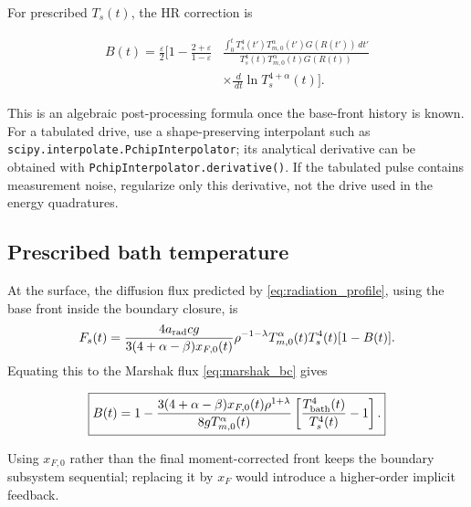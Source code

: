 \documentclass[11pt]{article}
\numberwithin{equation}{section}
\newcommand{\Ts}{T_s}
\newcommand{\Tb}{T_{\rm bath}}
\newcommand{\Tm}{T_{m,0}}
\newcommand{\xf}{x_F}
\newcommand{\xfzero}{x_{F,0}}
\newcommand{\eps}{\varepsilon}
\newcommand{\arad}{a_{\rm rad}}
\newcommand{\dif}{\,d}
\begin{document}
For prescribed $\Ts(t)$, the HR correction is
\begin{resultbox}
\begin{equation}
 \boxed{
 \begin{aligned}
 B(t)=\frac{\eps}{2}\Bigg[1
 -\frac{2+\eps}{1-\eps}
 &\frac{\displaystyle
 \int_0^t\Ts^4(t')\Tm^\alpha(t')G(R(t'))\dif t'}
 {\Ts^4(t)\Tm^\alpha(t)G(R(t))}
 \\
 &\times\frac{\dif}{\dif t}\ln\Ts^{4+\alpha}(t)
 \Bigg].
 \end{aligned}}
 \label{eq:B_Ts}
\end{equation}
\end{resultbox}
This is an algebraic post-processing formula once the base-front history is
known.  For a tabulated drive, use a shape-preserving interpolant such as
\texttt{scipy.interpolate.PchipInterpolator}; its analytical derivative can
be obtained with \texttt{PchipInterpolator.derivative()}.  If the tabulated
pulse contains measurement noise, regularize only this derivative, not the
drive used in the energy quadratures.

\subsection{Prescribed bath temperature}

At the surface, the diffusion flux predicted by
\eqref{eq:radiation_profile}, using the base front inside the boundary closure,
is
\begin{equation}
 F_s(t)
 =\frac{4\arad c g}{3(4+\alpha-\beta)\xfzero(t)}
 \rho^{-1-\lambda}\Tm^\alpha(t)\Ts^4(t)[1-B(t)].
 \label{eq:surface_flux_profile}
\end{equation}
Equating this to the Marshak flux \eqref{eq:marshak_bc} gives
\begin{resultbox}
\begin{equation}
 \boxed{
 B(t)=1-
 \frac{3(4+\alpha-\beta)\xfzero(t)\rho^{1+\lambda}}
 {8g\Tm^\alpha(t)}
 \left[\frac{\Tb^4(t)}{\Ts^4(t)}-1\right].}
 \label{eq:B_bath}
\end{equation}
\end{resultbox}
Using $\xfzero$ rather than the final moment-corrected front keeps the boundary
subsystem sequential; replacing it by $\xf$ would introduce a higher-order
implicit feedback.
\end{document}
